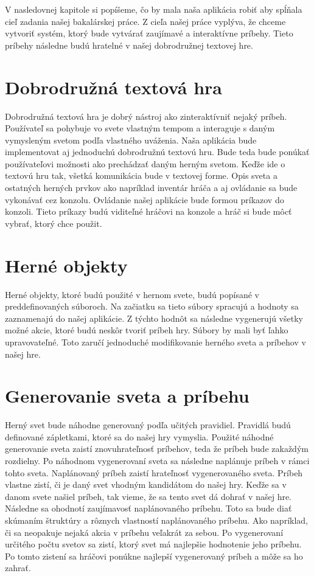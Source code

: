 V nasledovnej kapitole si popíšeme, čo by mala naša aplikácia robiť aby spĺňala cieľ zadania našej bakalárskej práce. Z cieľa našej práce vyplýva, že chceme vytvoriť systém, ktorý bude vytvárať zaujímavé a interaktívne príbehy. Tieto príbehy následne budú hratelné v našej dobrodružnej textovej hre.\par
\section{Dobrodružná textová hra}
Dobrodružná textová hra je dobrý nástroj ako zinteraktívniť nejaký príbeh. Používateľ sa pohybuje vo svete vlastným tempom a interaguje s daným vymysleným svetom podľa vlastného uváženia. Naša aplikácia bude implementovat aj jednoduchú dobrodružnú textovú hru. Bude teda bude ponúkať používateľovi možnosti ako prechádzať daným herným svetom. Keďže ide o textovú hru tak, všetká komunikácia bude v textovej forme. Opis sveta a ostatných herných prvkov ako napríklad inventár hráča a aj ovládanie sa bude vykonávať cez konzolu. Ovládanie našej aplikácie bude formou príkazov do konzoli. Tieto príkazy budú viditeľné hráčovi na konzole a hráč si bude môcť vybrať, ktorý chce použit.\par
\section{Herné objekty}
Herné objekty, ktoré budú použité v hernom svete, budú popísané v preddefinovaných súboroch. Na začiatku sa tieto súbory spracujú a hodnoty sa zaznamenajú do našej aplikácie. Z týchto hodnôt sa následne vygenerujú všetky možné akcie, ktoré budú neskôr tvoriť príbeh hry. Súbory by mali byť ľahko upravovateľné. Toto zaručí jednoduché modifikovanie herného sveta a príbehov v našej hre.\par
\section{Generovanie sveta a príbehu}
Herný svet bude náhodne generovaný podľa učitých pravidiel. Pravidlá budú definované zápletkami, ktoré sa do našej hry vymyslia. Použité náhodné generovanie sveta zaistí znovuhrateľnosť príbehov, teda že príbeh bude zakaždým rozdielny. Po náhodnom vygenerovaní sveta sa následne naplánuje príbeh v rámci tohto sveta. Naplánovaný príbeh zaistí hrateľnosť vygenerovaného sveta. Príbeh vlastne zistí, či je daný svet vhodným kandidátom do našej hry. Keďže sa v danom svete našiel príbeh, tak vieme, že sa tento svet dá dohrať v našej hre. Následne sa ohodnotí zaujímavosť naplánovaného príbehu. Toto sa bude diať skúmaním štruktúry a rôznych vlastností naplánovaného príbehu. Ako napríklad, či sa neopakuje nejaká akcia v príbehu veľakrát za sebou. Po vygenerovaní určitého počtu svetov sa zistí, ktorý svet má najlepšie hodnotenie jeho príbehu. Po tomto zistení sa hráčovi ponúkne najlepší vygenerovaný príbeh a môže sa ho zahrať.\par
